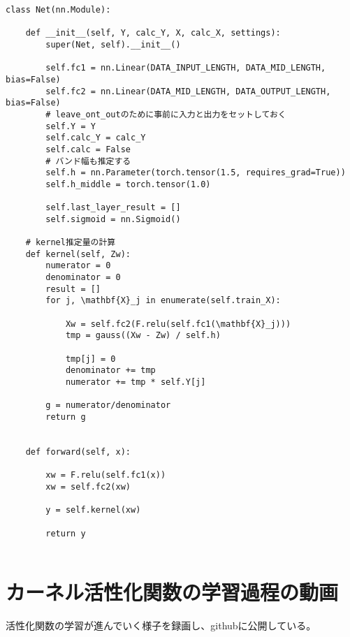 \begin{lstlisting}[caption=Pytorchを用いたK-AFの計算用のクラス,label=python_impl]
class Net(nn.Module):

    def __init__(self, Y, calc_Y, X, calc_X, settings):
        super(Net, self).__init__()

        self.fc1 = nn.Linear(DATA_INPUT_LENGTH, DATA_MID_LENGTH, bias=False)
        self.fc2 = nn.Linear(DATA_MID_LENGTH, DATA_OUTPUT_LENGTH, bias=False)
        # leave_ont_outのために事前に入力と出力をセットしておく
        self.Y = Y
        self.calc_Y = calc_Y
        self.calc = False
        # バンド幅も推定する
        self.h = nn.Parameter(torch.tensor(1.5, requires_grad=True))
        self.h_middle = torch.tensor(1.0)

        self.last_layer_result = []
        self.sigmoid = nn.Sigmoid()

    # kernel推定量の計算
    def kernel(self, Zw):
        numerator = 0
        denominator = 0
        result = []
        for j, \mathbf{X}_j in enumerate(self.train_X):

            Xw = self.fc2(F.relu(self.fc1(\mathbf{X}_j)))
            tmp = gauss((Xw - Zw) / self.h)

            tmp[j] = 0
            denominator += tmp
            numerator += tmp * self.Y[j]

        g = numerator/denominator
        return g


    def forward(self, x):

        xw = F.relu(self.fc1(x))
        xw = self.fc2(xw)

        y = self.kernel(xw)

        return y


\end{lstlisting}


\chapter{カーネル活性化関数の学習過程の動画}
\label{appendix:movie}

活性化関数の学習が進んでいく様子を録画し、githubに公開している。



